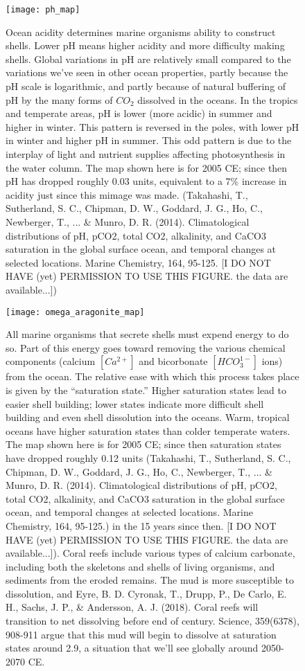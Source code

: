 {\newpage
\begin{figure}[p]
\centering
  \texttt{[image: ph\_map]}%
\caption{Ocean acidity determines marine organisms ability to construct shells. Lower pH means higher acidity and more difficulty making shells. Global variations in pH are relatively small compared to the variations we've seen in other ocean properties, partly because the pH scale is logarithmic, and partly because of natural buffering of pH by the many forms of $CO_2$ dissolved in the oceans. In the tropics and temperate areas, pH is lower (more acidic) in summer and higher in winter. This pattern is reversed in the poles, with lower pH in winter and higher pH in summer. This odd pattern is due to the interplay of light and nutrient supplies affecting photosynthesis in the water column. The map shown here is for 2005 CE; since then pH has dropped roughly 0.03 units, equivalent to a 7\% increase in acidity just since this mimage was made. (Takahashi, T., Sutherland, S. C., Chipman, D. W., Goddard, J. G., Ho, C., Newberger, T., ... \& Munro, D. R. (2014). Climatological distributions of pH, pCO2, total CO2, alkalinity, and CaCO3 saturation in the global surface ocean, and temporal changes at selected locations. Marine Chemistry, 164, 95-125. [I DO NOT HAVE (yet) PERMISSION TO USE THIS FIGURE. the data are available...])  }
\label{fig:ph_map}
\end{figure}


\begin{figure}[p]
\centering
  \texttt{[image: omega\_aragonite\_map]}%
\caption{All marine organisms that secrete shells must expend energy to do so. Part of this energy goes toward removing the various chemical components (calcium  $[Ca^{2+}]$ and bicorbonate $[HCO_3^{1-}]$ ions) from the ocean. The relative ease with which this process takes place is given by the ``saturation state.'' Higher saturation states lead to easier shell building; lower states indicate more difficult shell building and even shell dissolution into the oceans. Warm, tropical oceans have higher saturation states than colder temperate waters. The map shown here is for 2005 CE; since then saturation states have dropped roughly 0.12 units (Takahashi, T., Sutherland, S. C., Chipman, D. W., Goddard, J. G., Ho, C., Newberger, T., ... \& Munro, D. R. (2014). Climatological distributions of pH, pCO2, total CO2, alkalinity, and CaCO3 saturation in the global surface ocean, and temporal changes at selected locations. Marine Chemistry, 164, 95-125.) in the 15 years since then. [I DO NOT HAVE (yet) PERMISSION TO USE THIS FIGURE. the data are available...]). Coral reefs include various types of calcium carbonate, including both the skeletons and shells of living organisms, and sediments from the eroded remains. The mud is more susceptible to dissolution, and Eyre, B. D. Cyronak, T., Drupp, P., De Carlo, E. H., Sachs, J. P., \& Andersson, A. J. (2018). Coral reefs will transition to net dissolving before end of century. Science, 359(6378), 908-911 argue that this mud will begin to dissolve at saturation states around 2.9, a situation that we'll see globally around 2050-2070 CE.  }
\label{fig:arag_map}
\end{figure}



}
